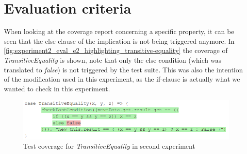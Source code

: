 \section{Evaluation criteria}
When looking at the coverage report concerning a specific property, it can be
seen that the else-clause of the implication is not being triggered anymore. In
\autoref{fig:experiment2_eval_e2_highlighting_transitive-equality} the coverage
of \textit{TransitiveEquality} is shown, note that only the else condition
(which was translated to \textit{false}) is not triggered by the test suite.
This was also the intention of the modification used in this experiment, as the
if-clause is actually what we wanted to check in this experiment.
\FloatBarrier
\begin{figure}[!ht]
	\includegraphics[width=\linewidth]{figures/eval_e2_transitive-equality}
\caption{Test coverage for \textit{TransitiveEquality} in second experiment}
\label{fig:experiment2_eval_e2_highlighting_transitive-equality}
\centering
\end{figure}
\FloatBarrier

